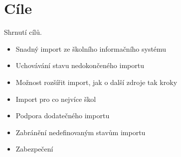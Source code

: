 \section{Cíle}
Shrnutí cílů.
\begin{itemize}
    \item Snadný import ze školního informačního systému
    \item Uchovávání stavu nedokončeného importu
    \item Možnost rozšířit import, jak o další zdroje tak kroky
    \item Import pro co nejvíce škol
    \item Podpora dodatečného importu
    \item Zabránění nedefinovaným stavům importu
    \item Zabezpečení
\end{itemize}
